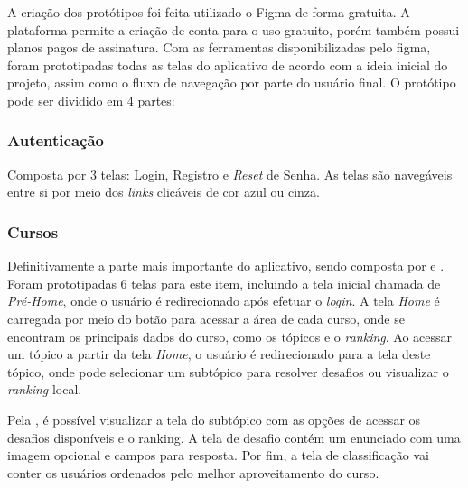 A criação dos protótipos foi feita utilizado o Figma de forma gratuita. A plataforma permite a criação de conta para o uso gratuito, porém também possui planos pagos de assinatura. Com as ferramentas disponibilizadas pelo figma, foram prototipadas todas as telas do aplicativo de acordo com a ideia inicial do projeto, assim como o fluxo de navegação por parte do usuário final. O protótipo pode ser dividido em 4 partes:

\subsubsection{Autenticação}

Composta por 3 telas: Login, Registro e \textit{Reset} de Senha. As telas são navegáveis entre si por meio dos \textit{links} clicáveis de cor azul ou cinza.


\subsubsection{Cursos}

Definitivamente a parte mais importante do aplicativo, sendo composta por  e . Foram prototipadas 6 telas para este item, incluindo a tela inicial chamada de \textit{Pré-Home}, onde o usuário é redirecionado após efetuar o \textit{login}. A tela \textit{Home} é carregada por meio do botão para acessar a área de cada curso, onde se encontram os principais dados do curso, como os tópicos e o \textit{ranking}. Ao acessar um tópico a partir da tela \textit{Home}, o usuário é redirecionado para a tela deste tópico, onde pode selecionar um subtópico para resolver desafios ou visualizar o \textit{ranking} local.


Pela , é possível visualizar a tela do subtópico com as opções de acessar os desafios disponíveis e o ranking. A tela de desafio contém um enunciado com uma imagem opcional e campos para resposta. Por fim, a tela de classificação vai conter os usuários ordenados pelo melhor aproveitamento do curso.


